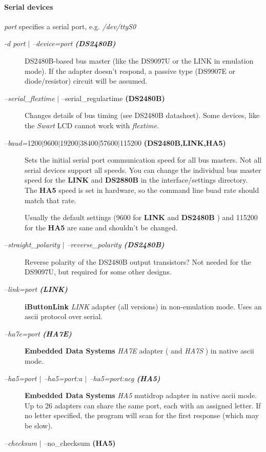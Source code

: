 \paragraph*{ Serial devices}
\textit{port}
 specifies a serial port, e.g.  \textit{/dev/ttyS0} \begin{description}
\item [\textit{-d port\textit{ }}$|$ \textit{--device=port\textit{ \textbf{(DS2480B)\textbf{
}}}}] DS2480B-based bus master (like the DS9097U or the LINK in emulation mode).
If the adapter doesn't respond, a passive type (DS9907E or diode/resistor)
circuit will be assumed. 
\item [\textit{--serial\_flextime} $|$ --serial\_regulartime \textbf{(DS2480B)\textbf{ }}] 

Changes details of bus timing (see DS2480B datasheet). Some devices, like
the \textit{Swart} LCD cannot work with \textit{flextime.} 
\item [\textit{--baud=\textit{}}1200$|$9600$|$19200$|$38400$|$57600$|$115200
\textbf{(DS2480B,LINK,HA5)\textbf{ }}] Sets the initial serial port communication speed for
all bus masters. Not all serial devices support all speeds. You can change
the individual bus master speed for the \textbf{LINK} and \textbf{DS2880B} in the interface/settings
directory. The \textbf{HA5} speed is set in hardware, so the command line buad rate
should match that rate. 

Usually the default settings (9600 for \textbf{LINK} and \textbf{DS2480B} ) and 115200 for
the \textbf{HA5} are sane and shouldn't be changed. 
\item [\textit{--straight\_polarity\textit{  }}$|$ \textit{--reverse\_polarity\textit{
\textbf{(DS2480B)\textbf{ }}}}] Reverse polarity of the DS2480B output transistors? Not needed
for the DS9097U, but required for some other designs. 
\item [\textit{--link=port\textit{ \textbf{(LINK)\textbf{ }}}}] \textbf{iButtonLink}
\textit{LINK} adapter (all versions) in non-emulation mode. Uses an ascii protocol
over serial. 
\item [\textit{--ha7e=port\textit{ \textbf{(HA7E)\textbf{ }}}}] \textbf{Embedded Data Systems} \textit{HA7E} adapter ( and \textit{HA7S}
) in native ascii mode. 
\item [\textit{--ha5=port $|$ --ha5=port:a $|$ --ha5=port:acg\textit{ \textbf{(HA5)\textbf{ }}}}] \textbf{Embedded
Data Systems} \textit{HA5} mutidrop adapter in native ascii mode. Up to 26 adapters
can share the same port, each with an assigned letter. If no letter specified,
the program will scan for the first response (which may be slow). 
\item [\textit{--checksum}
$|$ --no\_checksum \textbf{(HA5)\textbf{ }}] 


\end{description}
